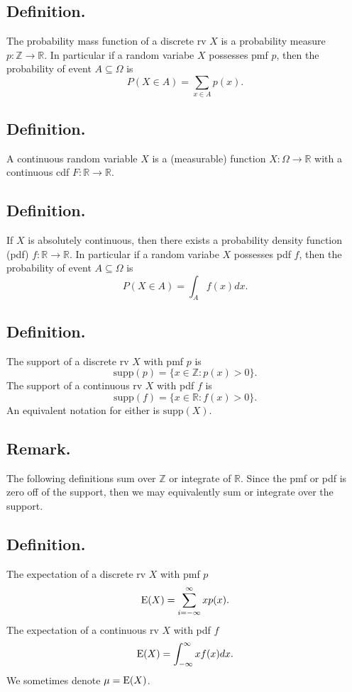 \documentclass[titlepage]{article}
\begin{document}
\subsection{Definition.} The probability mass function of a discrete rv $X$ is a probability measure $p: \mathbb{Z} \to \mathbb{R}$. In particular if a random variabe $X$ possesses pmf $p$, then the probability of event $A \subseteq \Omega$ is
$$P(X \in A) = \sum_{x \in A}p(x).$$

\subsection{Definition.} A continuous random variable $X$ is a (measurable) function $X: \Omega \to \mathbb{R}$ with a continuous cdf $F: \mathbb{R} \to \mathbb{R}$.

\subsection{Definition.} If $X$ is absolutely continuous, then there exists a probability density function (pdf) $f: \mathbb{R} \to \mathbb{R}$. In particular if a random variabe $X$ possesses pdf $f$, then the probability of event $A \subseteq \Omega$ is 
$$P(X \in A) = \int_{A}f(x)dx.$$

\subsection{Definition.} The support of a discrete rv $X$ with pmf $p$ is  
$$\text{supp}(p) = \{x \in \mathbb{Z} : p(x) > 0\}.$$
The support of a continuous rv $X$ with pdf $f$ is
$$\text{supp}(f) = \{x \in \mathbb{R} : f(x) > 0\}.$$
An equivalent notation for either is $\text{supp}(X)$.

\subsection{Remark.} The following definitions sum over $\mathbb{Z}$ or integrate of $\mathbb{R}$. Since the pmf or pdf is zero off of the support, then we may equivalently sum or integrate over the support.

\subsection{Definition.} The expectation of a discrete rv $X$ with pmf $p$
$$\text{E}(X) = \sum_{i=-\infty}^{\infty}xp(x).$$
The expectation of a continuous rv $X$ with pdf $f$
$$\text{E}(X) = \int_{-\infty}^{\infty}xf(x)dx.$$
We sometimes denote $\mu = \text{E}(X)$.
\end{document}

